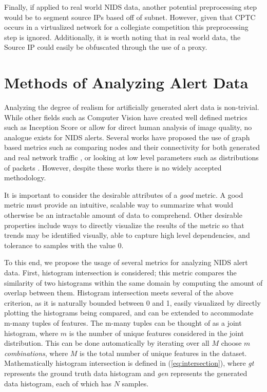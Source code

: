 Finally, if applied to real world NIDS data, another potential preprocessing step would be to segment source IPs based off of subnet. However, given that CPTC occurs in a virtualized network for a collegiate competition this preprocessing step is ignored. Additionally, it is worth noting that in real world data, the Source IP could easily be obfuscated through the use of a proxy. 


\section{Methods of Analyzing Alert Data}
\label{sec:anal}
Analyzing the degree of realism for artificially generated alert data is non-trivial. While other fields such as Computer Vision have created well defined metrics such as Inception Score \cite{Salimans2016} or allow for direct human analysis of image quality, no analogue exists for NIDS alerts. Several works have proposed the use of graph based metrics such as comparing nodes and their connectivity for both generated and real network traffic \cite{Siska2010, Iannucci}, or looking at low level parameters such as distributions of packets \cite{Sommers2004, Botta2012}. However, despite these works there is no widely accepted methodology.

It is important to consider the desirable attributes of a \emph{good} metric. A good metric must provide an intuitive, scalable way to summarize what would otherwise be an intractable amount of data to comprehend. Other desirable properties include ways to directly visualize the results of the metric so that trends may be identified visually, able to capture high level dependencies, and tolerance to samples with the value $0$. 

To this end, we propose the usage of several metrics for analyzing NIDS alert data. First, histogram intersection is considered; this metric compares the similarity of two histograms within the same domain by computing the amount of overlap between them. Histogram intersection meets several of the above criterion, as it is naturally bounded between 0 and 1, easily visualized by directly plotting the histograms being compared, and can be extended to accommodate m-many tuples of features. The m-many tuples can be thought of as a joint histogram, where $m$ is the number of unique features considered in the joint distribution. This can be done automatically by iterating over all $M$ choose $m$ \emph{combinations}, where $M$ is the total number of unique features in the dataset. Mathematically histogram intersection is defined in (\ref{eq:intersection}), where \emph{gt} represents the ground truth data histogram and \emph{gen} represents the generated data histogram, each of which has $N$ samples.

